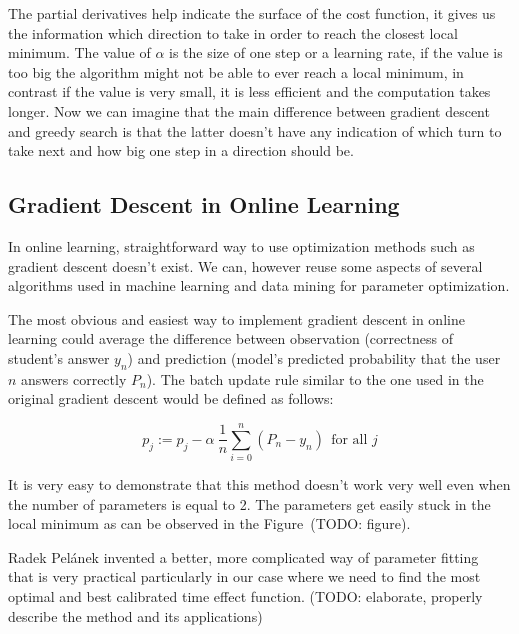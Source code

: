 The partial derivatives help indicate the surface of the cost function, it gives us the information which direction to take in order to reach the closest local minimum. The value of $\alpha$ is the size of one step or a learning rate, if the value is too big the algorithm might not be able to ever reach a local minimum, in contrast if the value is very small, it is less efficient and the computation takes longer. Now we can imagine that the main difference between gradient descent and greedy search is that the latter doesn't have any indication of which turn to take next and how big one step in a direction should be.

\subsection*{Gradient Descent in Online Learning}

In online learning, straightforward way to use optimization methods such as gradient descent doesn't exist. We can, however reuse some aspects of several algorithms used in machine learning and data mining for parameter optimization.

The most obvious and easiest way to implement gradient descent in online learning could average the difference between observation (correctness of student's answer $y_n$) and prediction (model's predicted probability that the user $n$ answers correctly $P_n$). The batch update rule similar to the one used in the original gradient descent would be defined as follows:

\begin{equation} \label{online-learning-batch-rule}
 p_j := p_j - \alpha~\frac{1}{n}\sum_{i=0}^n (P_n - y_n)~~\text{for all } j
\end{equation}

It is very easy to demonstrate that this method doesn't work very well even when the number of parameters is equal to 2. The parameters get easily stuck in the local minimum as can be observed in the Figure~(TODO: figure).

Radek Pelánek invented a better, more complicated way of parameter fitting~\cite{Pelanek2015} that is very practical particularly in our case where we need to find the most optimal and best calibrated time effect function. (TODO: elaborate, properly describe the method and its applications)
